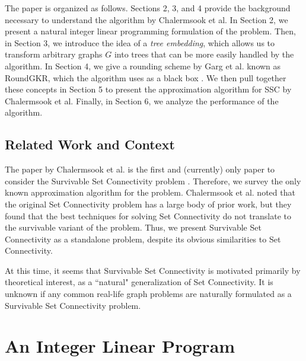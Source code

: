 \documentclass[12pt]{article}
\begin{document}
The paper is organized as follows. Sections 2, 3, and 4 provide the background necessary to understand the algorithm by Chalermsook et al. In Section 2, we present a natural integer linear programming formulation of the problem. Then, in Section 3, we introduce the idea of a \emph{tree embedding}, which allows us to transform arbitrary graphs $G$ into trees that can be more easily handled by the algorithm. In Section 4, we give a rounding scheme by Garg et al. known as RoundGKR, which the algorithm uses as a black box \cite{GKR}. We then pull together these concepts in Section 5 to present the approximation algorithm for SSC by Chalermsook et al. Finally, in Section 6, we analyze the performance of the algorithm.

\subsection{Related Work and Context}

The paper by Chalermsook et al. is the first and (currently) only paper to consider the Survivable Set Connectivity problem \cite{ssc}. Therefore, we survey the only known approximation algorithm for the problem. Chalermsook et al. noted that the original Set Connectivity problem has a large body of prior work, but they found that the best techniques for solving Set Connectivity do not translate to the survivable variant of the problem. Thus, we present Survivable Set Connectivity as a standalone problem, despite its obvious similarities to Set Connectivity.

At this time, it seems that Survivable Set Connectivity is motivated primarily by theoretical interest, as a ``natural" generalization of Set Connectivity. It is unknown if any common real-life graph problems are naturally formulated as a Survivable Set Connectivity problem.

\section{An Integer Linear Program}
\end{document}

